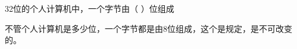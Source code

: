 \question 32位的个人计算机中，一个字节由（ ）位组成
\par{}
\begin{solution}不管个人计算机是多少位，一个字节都是由8位组成，这个是规定，是不可改变的。
\end{solution}
